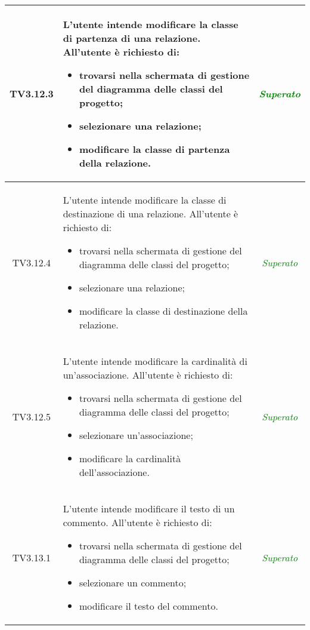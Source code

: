 \begin{longtable}{|c|>{}m{8cm}|c|}
\hypertarget{TV3.12.3}{TV3.12.3} & L'utente intende modificare la classe di partenza di una relazione.
All'utente è richiesto di:
\begin{itemize}
	\item trovarsi nella schermata di gestione del diagramma delle classi del progetto;
	\item selezionare una relazione;
	\item modificare la classe di partenza della relazione.
\end{itemize} & \textcolor{Green}{\textit{Superato}}\\ \hline

\hypertarget{TV3.12.4}{TV3.12.4} & L'utente intende modificare la classe di destinazione di una relazione.
All'utente è richiesto di:
\begin{itemize}
	\item trovarsi nella schermata di gestione del diagramma delle classi del progetto;
	\item selezionare una relazione;
	\item modificare la classe di destinazione della relazione.
\end{itemize} & \textcolor{Green}{\textit{Superato}}\\ \hline

\hypertarget{TV3.12.5}{TV3.12.5} & L'utente intende modificare la cardinalità di un'associazione.
All'utente è richiesto di:
\begin{itemize}
	\item trovarsi nella schermata di gestione del diagramma delle classi del progetto;
	\item selezionare un'associazione;
	\item modificare la cardinalità dell'associazione.
\end{itemize} & \textcolor{Green}{\textit{Superato}}\\ \hline

\hypertarget{TV3.13.1}{TV3.13.1} & L'utente intende modificare il testo di un commento. 
All'utente è richiesto di: 
\begin{itemize}
	\item trovarsi nella schermata di gestione del diagramma delle classi del progetto;
	\item selezionare un commento;
	\item modificare il testo del commento.
\end{itemize} & \textcolor{Green}{\textit{Superato}}\\ \hline


\end{longtable}
